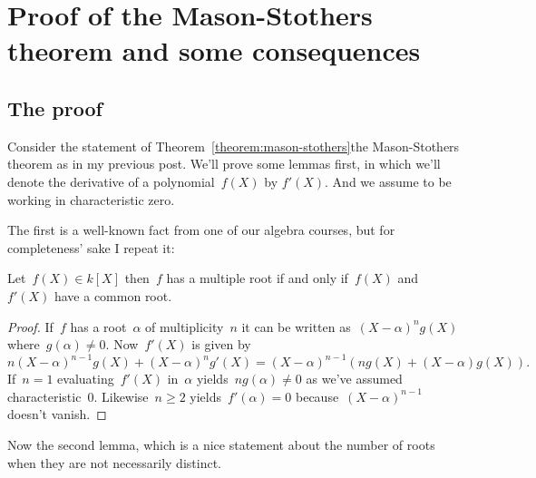 \section{Proof of the Mason-Stothers theorem and some consequences}
\label{section:proof-and-consequences}

\subsection{The proof}

Consider the statement of \iftex Theorem~\ref{theorem:mason-stothers}\fi\ifblog the Mason-Stothers theorem as in my previous post\fi. We'll prove some lemmas first, in which we'll denote the derivative of a polynomial~$f(X)$ by $f'(X)$. And we assume to be working in characteristic zero.

The first is a well-known fact from one of our algebra courses, but for completeness' sake I repeat it:

\begin{lemma}
  Let~$f(X)\in k[X]$ then~$f$ has a multiple root if and only if~$f(X)$ and~$f'(X)$ have a common root.

  \begin{proof}
    If~$f$ has a root~$\alpha$ of multiplicity~$n$ it can be written as~$(X-\alpha)^ng(X)$ where~$g(\alpha)\neq 0$. Now~$f'(X)$ is given by
    \begin{equation}
      n(X-\alpha)^{n-1}g(X)+(X-\alpha)^ng'(X)=(X-\alpha)^{n-1}\left( ng(X)+(X-\alpha)g(X) \right).
    \end{equation}
    If~$n=1$ evaluating~$f'(X)$ in~$\alpha$ yields~$ng(\alpha)\neq 0$ as we've assumed characteristic~$0$. Likewise~$n\geq 2$ yields~$f'(\alpha)=0$ because~$(X-\alpha)^{n-1}$ doesn't vanish.
  \end{proof}
\end{lemma}

Now the second lemma, which is a nice statement about the number of roots when they are not necessarily distinct.

